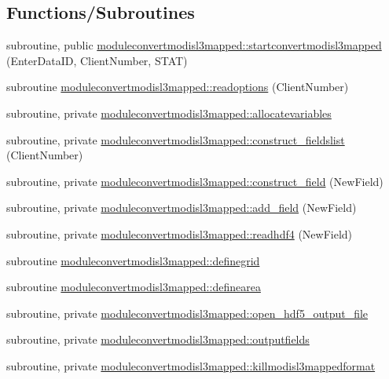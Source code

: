 \subsection*{Functions/\+Subroutines}
\begin{DoxyCompactItemize}
\item 
subroutine, public \mbox{\hyperlink{namespacemoduleconvertmodisl3mapped_a18d5802527fa5553ab45a5c110557d2b}{moduleconvertmodisl3mapped\+::startconvertmodisl3mapped}} (Enter\+Data\+ID, Client\+Number, S\+T\+AT)
\item 
subroutine \mbox{\hyperlink{namespacemoduleconvertmodisl3mapped_a0f034c5b727c268c416d8c9dfec265e3}{moduleconvertmodisl3mapped\+::readoptions}} (Client\+Number)
\item 
subroutine, private \mbox{\hyperlink{namespacemoduleconvertmodisl3mapped_ac229afc3a01cac186e0abd3c19093d2a}{moduleconvertmodisl3mapped\+::allocatevariables}}
\item 
subroutine, private \mbox{\hyperlink{namespacemoduleconvertmodisl3mapped_a9ccec60dccec78cdbd1bb6e2b82e4c6b}{moduleconvertmodisl3mapped\+::construct\+\_\+fieldslist}} (Client\+Number)
\item 
subroutine, private \mbox{\hyperlink{namespacemoduleconvertmodisl3mapped_a74d74f88259002bec089959db1c1370b}{moduleconvertmodisl3mapped\+::construct\+\_\+field}} (New\+Field)
\item 
subroutine, private \mbox{\hyperlink{namespacemoduleconvertmodisl3mapped_a3fa5a2918388eb33951d0fcae3d4bbb6}{moduleconvertmodisl3mapped\+::add\+\_\+field}} (New\+Field)
\item 
subroutine, private \mbox{\hyperlink{namespacemoduleconvertmodisl3mapped_a848303d0a614c18b94629b24f417fee7}{moduleconvertmodisl3mapped\+::readhdf4}} (New\+Field)
\item 
subroutine \mbox{\hyperlink{namespacemoduleconvertmodisl3mapped_a82cd68f8503b3a5bf96e529ac4715405}{moduleconvertmodisl3mapped\+::definegrid}}
\item 
subroutine \mbox{\hyperlink{namespacemoduleconvertmodisl3mapped_aa45a197b9dfbeea974438b114ede6c92}{moduleconvertmodisl3mapped\+::definearea}}
\item 
subroutine, private \mbox{\hyperlink{namespacemoduleconvertmodisl3mapped_ae7ff1f4d8258c08682ea6db04a074c74}{moduleconvertmodisl3mapped\+::open\+\_\+hdf5\+\_\+output\+\_\+file}}
\item 
subroutine, private \mbox{\hyperlink{namespacemoduleconvertmodisl3mapped_ac1aafb9181d66e361d34ec58c03d59bb}{moduleconvertmodisl3mapped\+::outputfields}}
\item 
subroutine, private \mbox{\hyperlink{namespacemoduleconvertmodisl3mapped_a92c7eb5c01d20a3540cef8d0d437bb08}{moduleconvertmodisl3mapped\+::killmodisl3mappedformat}}
\end{DoxyCompactItemize}
